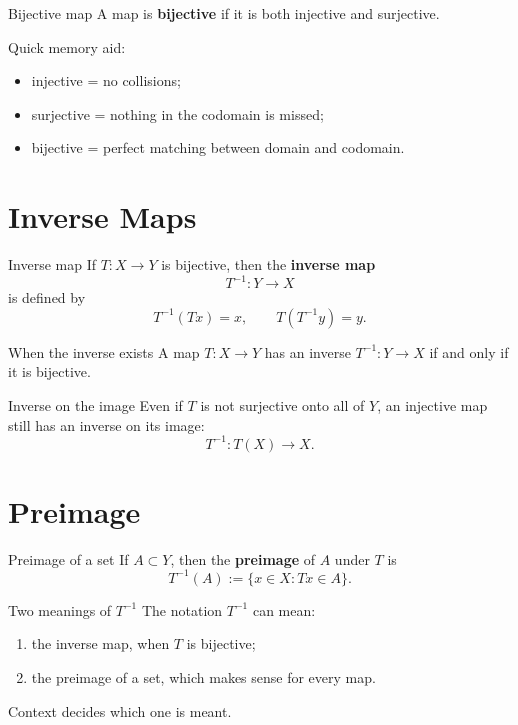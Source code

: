 \documentclass[header={Ancillary Note: Basic Mappings},notheorems]{study-note}
\begin{document}
\begin{defbox}{Bijective map}
A map is \textbf{bijective} if it is both injective and surjective.
\end{defbox}

\begin{focusbox}
Quick memory aid:
\begin{itemize}
\item injective = no collisions;
\item surjective = nothing in the codomain is missed;
\item bijective = perfect matching between domain and codomain.
\end{itemize}
\end{focusbox}

\section{Inverse Maps}

\begin{defbox}{Inverse map}
If $T:X\to Y$ is bijective, then the \textbf{inverse map}
\[
T^{-1}:Y\to X
\]
is defined by
\[
T^{-1}(Tx)=x,
\qquad
T(T^{-1}y)=y.
\]
\end{defbox}

\begin{thmbox}{When the inverse exists}
A map $T:X\to Y$ has an inverse $T^{-1}:Y\to X$ if and only if it is bijective.
\end{thmbox}

\begin{exbox}{Inverse on the image}
Even if $T$ is not surjective onto all of $Y$, an injective map still has an inverse on its image:
\[
T^{-1}:T(X)\to X.
\]
\end{exbox}

\section{Preimage}

\begin{defbox}{Preimage of a set}
If $A\subset Y$, then the \textbf{preimage} of $A$ under $T$ is
\[
T^{-1}(A):=\{x\in X:Tx\in A\}.
\]
\end{defbox}

\begin{warningbox}{Two meanings of $T^{-1}$}
The notation $T^{-1}$ can mean:
\begin{enumerate}
\item the inverse map, when $T$ is bijective;
\item the preimage of a set, which makes sense for every map.
\end{enumerate}
Context decides which one is meant.
\end{warningbox}
\end{document}
